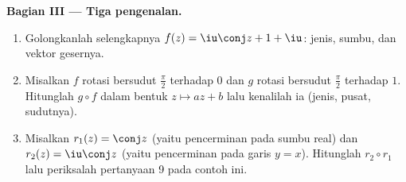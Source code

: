 \begin{problem}
\medskip
\noindent\textbf{Bagian III --- Tiga pengenalan.}
\begin{enumerate}[resume]
  \item Golongkanlah selengkapnya $f(z) = \iu\conj z + 1 + \iu$:
        jenis, sumbu, dan vektor gesernya.
  \item Misalkan $f$ rotasi bersudut $\frac\pi2$ terhadap $0$
        dan $g$ rotasi bersudut $\frac\pi2$ terhadap $1$.
        Hitunglah $g \circ f$ dalam bentuk $z \mapsto az + b$ lalu
        kenalilah ia (jenis, pusat, sudutnya).
  \item Misalkan $r_1(z) = \conj z$ (yaitu pencerminan pada sumbu real) dan
        $r_2(z) = \iu\conj z$ (yaitu pencerminan pada garis $y = x$).
        Hitunglah $r_2 \circ r_1$ lalu periksalah pertanyaan 9 pada contoh
        ini.
\end{enumerate}


\end{problem}
